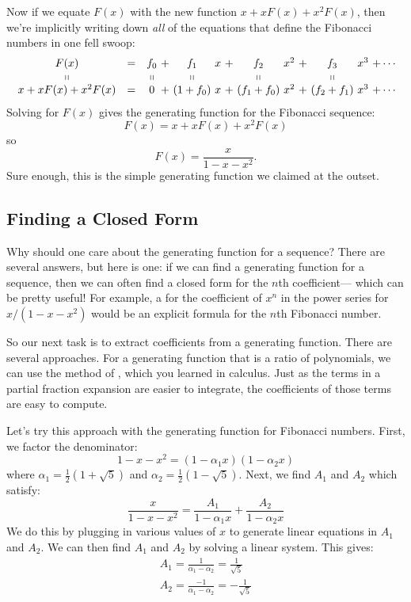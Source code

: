 Now if we equate $F(x)$ with the new function $x + x F(x) + x^2 F(x)$,
then we're implicitly writing down \textit{all} of the equations that
define the Fibonacci numbers in one fell swoop:
%
\[
\begin{array}{ccc@{\ }c@{\ }c@{\ }c@{\ }c@{\ }c@{\ }c@{\ }c@{\ }c@{\ }c@{\ }c@{\ }c@{\ }c}
F(x)
    & = & f_0 & + & f_1 & x & + & f_2 & x^2 & + & f_3 & x^3 & + \cdots \\
\shortparallel && \shortparallel && \shortparallel &&& \shortparallel &&& \shortparallel\\
x + x F(x) + x^2 F(x)
    & = & 0 & + & (1 + f_0) & x & + & (f_1 + f_0) & x^2 & + & (f_2 + f_1) & x^3 & + \cdots
\end{array}
\]
%
Solving for $F(x)$ gives the generating function for the Fibonacci
sequence:
%
\[
F(x)  = x + x F(x) + x^2 F(x)
\]
so
\[
F(x) = \frac{x}{1 - x - x^2}.
\]
%
Sure enough, this is the simple generating function we claimed at the
outset.

\subsection{Finding a Closed Form}

Why should one care about the generating function for a sequence?  There
are several answers, but here is one: if we can find a generating function
for a sequence, then we can often find a closed form for the $n$th
coefficient--- which can be pretty useful!  For example, a  for the coefficient of $x^n$ in the power series for $x / (1 - x -
x^2)$ would be an explicit formula for the $n$th Fibonacci number.

So our next task is to extract coefficients from a generating function.
There are several approaches.  For a generating function that is a ratio
of polynomials, we can use the method of , which
you learned in calculus.  Just as the terms in a partial fraction
expansion are easier to integrate, the coefficients of those terms are
easy to compute.

Let's try this approach with the generating function for Fibonacci
numbers.  First, we factor the denominator:
%
\[
1 - x - x^2 = (1 - \alpha_1 x) (1 - \alpha_2 x)
\]
%
where $\alpha_1 = \frac{1}{2}(1 + \sqrt{5})$ and $\alpha_2 =
\frac{1}{2}(1 - \sqrt{5})$.  Next, we find $A_1$ and $A_2$ which
satisfy:
%
\[
\frac{x}{1 - x - x^2} =
        \frac{A_1}{1 - \alpha_1 x} + \frac{A_2}{1 - \alpha_2 x}
\]
%
We do this by plugging in various values of $x$ to generate linear
equations in $A_1$ and $A_2$.  We can then find $A_1$ and $A_2$ by
solving a linear system.  This gives:
%
\begin{gather*}
A_1 = \frac{1}{\alpha_1 - \alpha_2} = \frac{1}{\sqrt{5}} \\
A_2 = \frac{-1}{\alpha_1 - \alpha_2} = -\frac{1}{\sqrt{5}}
\end{gather*}

